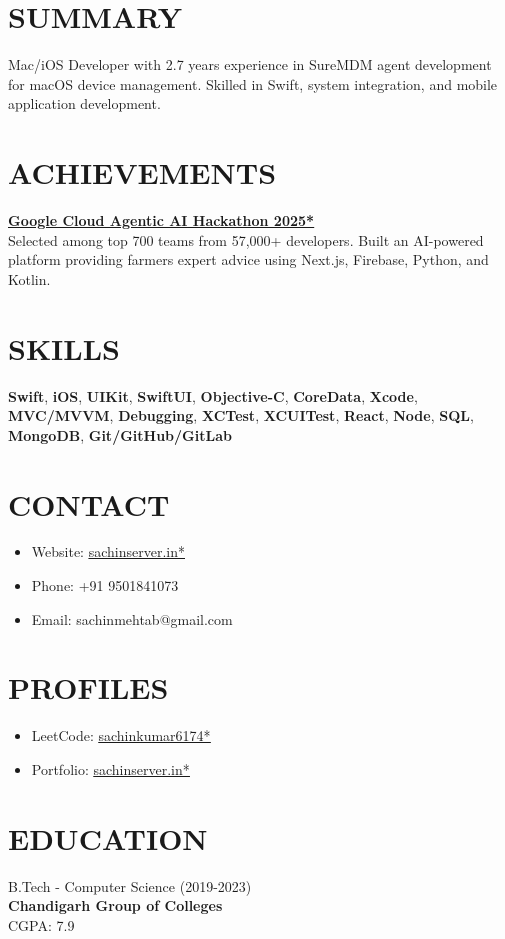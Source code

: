 \documentclass[11pt,a4paper]{moderncv}
\let\oldhref\href
\renewcommand{\href}[2]{\oldhref{#1}{\underline{#2}}}
\begin{document}
\begin{minipage}[t]{0.35\textwidth}
\section{SUMMARY}
Mac/iOS Developer with 2.7 years experience in SureMDM agent development for macOS device management. Skilled in Swift, system integration, and mobile application development.

\section{ACHIEVEMENTS}
\textbf{\href{https://github.com/abhikumar002/Agentic-Gig-Project}{Google Cloud Agentic AI Hackathon 2025*}} \\
Selected among top 700 teams from 57,000+ developers. Built an AI-powered platform providing farmers expert advice using Next.js, Firebase, Python, and Kotlin.

\section{SKILLS}
\textbf{Swift}, \textbf{iOS}, \textbf{UIKit}, \textbf{SwiftUI}, \textbf{Objective-C}, \textbf{CoreData}, \textbf{Xcode}, \textbf{MVC/MVVM}, \textbf{Debugging}, \textbf{XCTest}, \textbf{XCUITest}, \textbf{React}, \textbf{Node}, \textbf{SQL}, \textbf{MongoDB}, \textbf{Git/GitHub/GitLab}

\section{CONTACT}
\begin{itemize}
    \item Website: \href{https://www.sachinserver.in}{sachinserver.in*}
    \item Phone: +91 9501841073
    \item Email: sachinmehtab@gmail.com
\end{itemize}

\section{PROFILES}
\begin{itemize}
    \item LeetCode: \href{https://leetcode.com/u/sachinkumar6174/}{sachinkumar6174*}
    \item Portfolio: \href{https://sachinserver.in/}{sachinserver.in*}
\end{itemize}

\section{EDUCATION}
B.Tech - Computer Science (2019-2023) \\
\textbf{Chandigarh Group of Colleges} \\
\faCalendar\enspace CGPA: 7.9
\end{minipage}
\end{document}
